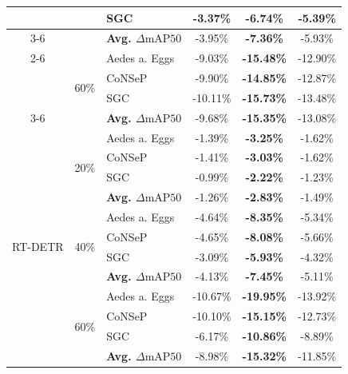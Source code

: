 \begin{tabular}{cclccc}
& & SGC           & -3.37\% & \textbf{-6.74\%} & -5.39\% \\
\cmidrule(lr){3-6}
& & \textbf{Avg. $\Delta\text{mAP50}$} & -3.95\% & \textbf{-7.36\%} & -5.93\% \\
\cmidrule(lr){2-6}
& \multirow{4}{*}{60\%} 
& Aedes a. Eggs & -9.03\% & \textbf{-15.48\%} & -12.90\% \\
& & CoNSeP        & -9.90\% & \textbf{-14.85\%} & -12.87\% \\
& & SGC           & -10.11\% & \textbf{-15.73\%} & -13.48\% \\
\cmidrule(lr){3-6}
& & \textbf{Avg. $\Delta\text{mAP50}$} & -9.68\% & \textbf{-15.35\%} & -13.08\% \\
\midrule
\multirow{12}{*}{RT-DETR} 
& \multirow{4}{*}{20\%} 
& Aedes a. Eggs & -1.39\% & \textbf{-3.25\%} & -1.62\% \\
& & CoNSeP        & -1.41\% & \textbf{-3.03\%} & -1.62\% \\
& & SGC           & -0.99\% & \textbf{-2.22\%} & -1.23\% \\
\cmidrule(lr){3-6}
& & \textbf{Avg. $\Delta\text{mAP50}$} & -1.26\% & \textbf{-2.83\%} & -1.49\% \\
\cmidrule(lr){2-6}
& \multirow{4}{*}{40\%} 
& Aedes a. Eggs & -4.64\% & \textbf{-8.35\%} & -5.34\% \\
& & CoNSeP        & -4.65\% & \textbf{-8.08\%} & -5.66\% \\
& & SGC           & -3.09\% & \textbf{-5.93\%} & -4.32\% \\
\cmidrule(lr){3-6}
& & \textbf{Avg. $\Delta\text{mAP50}$} & -4.13\% & \textbf{-7.45\%} & -5.11\% \\
\cmidrule(lr){2-6}
& \multirow{4}{*}{60\%} 
& Aedes a. Eggs & -10.67\% & \textbf{-19.95\%} & -13.92\% \\
& & CoNSeP        & -10.10\% & \textbf{-15.15\%} & -12.73\% \\
& & SGC           & -6.17\% & \textbf{-10.86\%} & -8.89\% \\
\cmidrule(lr){3-6}
& & \textbf{Avg. $\Delta\text{mAP50}$} & -8.98\% & \textbf{-15.32\%} & -11.85\% \\
\bottomrule
\end{tabular}
